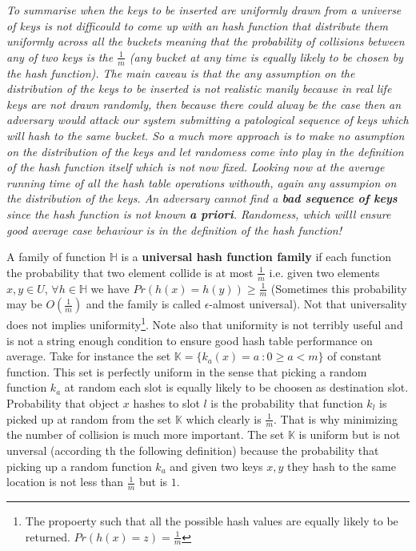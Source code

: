 \textit{To summarise when the keys to be inserted are uniformly drawn from a universe of keys is not difficould to come up with an hash function that distribute them uniformly across all the buckets meaning that the probability of collisions between any of two keys is the $\frac{1}{m}$ (any bucket at any time is equally likely to be chosen by the hash function). The main caveau is that the any assumption on the distribution of the keys to be inserted is not realistic manily because in real life keys are not drawn randomly, then because there could alway be the case then an adversary would attack our system submitting a patological sequence of keys which will hash to the same bucket. So a much more approach is to  make no asumption on the distribution of the keys and let randomess come into play in the definition of the hash function itself which is not now fixed. Looking now at the average running time of all the hash table operations withouth, again any assumpion on the distribution of the keys. An adversary cannot find a \textbf{bad sequence of keys} since the hash function is not known \textbf{a priori}. Randomess, which willl ensure good average case behaviour is in the definition of the hash function!} 

A family of function $\mathbb{H}$ is a  \textbf{universal hash function family} if each function the probability that two element collide is at most $\frac{1}{m}$ i.e. given two elements $x,y \in U$, $\forall h \in \mathbb{H}$ we have $Pr(h(x) = h(y)) \geq \frac{1}{m}$ (Sometimes this probability may be $O(\frac{1}{m})$ and the family is called $\epsilon$-almost universal). Not that universality does not implies uniformity\footnote{The propoerty such that all the possible hash values are equally likely to be returned. $Pr(h(x)=z) = \frac{1}{m}$}. Note also that uniformity is not terribly useful and is not a string enough condition to ensure good hash table performance on average. Take for instance the set $\mathbb{K} = \{ k_a(x) = a \: : 0\geq a<m\}$ of  constant function. This set is perfectly uniform in the sense that picking a random function $k_a$ at random each slot is equally likely to be choosen as destination slot. Probability that object $x$ hashes to slot $l$ is the probability that function $k_l$ is picked up at random from the set $\mathbb{K}$ which clearly is $\frac{1}{m}$. That is why minimizing the number of collision is much more important. The set $\mathbb{K}$ is uniform but is not unversal (according th the following definition) because the probability that picking up a random function $k_a$ and given two keys $x,y$ they hash to the same location is not less than $\frac{1}{m}$ but is $1$.


